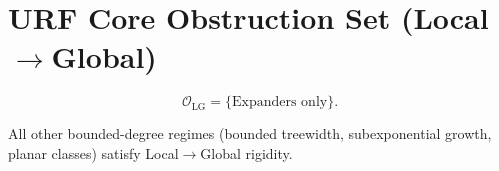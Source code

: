 \section{URF Core Obstruction Set (Local$\to$Global)}

\begin{definition}
\[
\mathcal O_{\mathrm{LG}}=\{\text{Expanders only}\}.
\]
\end{definition}

\begin{remark}
All other bounded-degree regimes (bounded treewidth, subexponential growth,
planar classes) satisfy Local$\to$Global rigidity.
\end{remark}

